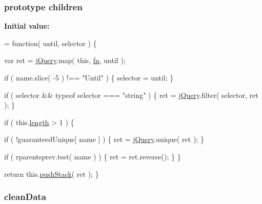 \subsubsection[{children}]{ {\bf prototype} children}\label{jquery-1_810_82-vsdoc_8js_a8f481f41dc3f2af7fcadd06c7fba0815}
{\bfseries Initial value\+:}
\begin{DoxyCode}
= \textcolor{keyword}{function}( until, selector ) \{


        var ret = \hyperlink{jquery-1_810_82-vsdoc_8js_add5237586d970a38a81f990e8eb28c6c}{jQuery}.map( \textcolor{keyword}{this}, \hyperlink{jquery-1_810_82-vsdoc_8js_acef6bdaf6b9b20fdcca1ea86f0902c3b}{fn}, until );

        \textcolor{keywordflow}{if} ( name.slice( -5 ) !== \textcolor{stringliteral}{"Until"} ) \{
            selector = until;
        \}

        \textcolor{keywordflow}{if} ( selector && typeof selector === \textcolor{stringliteral}{"string"} ) \{
            ret = \hyperlink{jquery-1_810_82-vsdoc_8js_add5237586d970a38a81f990e8eb28c6c}{jQuery}.filter( selector, ret );
        \}

        \textcolor{keywordflow}{if} ( this.\hyperlink{jquery-1_810_82-vsdoc_8js_aa7de35d58da66d9944ab9cbe82c19640}{length} > 1 ) \{
            
            \textcolor{keywordflow}{if} ( !guaranteedUnique[ name ] ) \{
                ret = \hyperlink{jquery-1_810_82-vsdoc_8js_add5237586d970a38a81f990e8eb28c6c}{jQuery}.unique( ret );
            \}

            
            \textcolor{keywordflow}{if} ( rparentsprev.test( name ) ) \{
                ret = ret.reverse();
            \}
        \}

        \textcolor{keywordflow}{return} this.\hyperlink{jquery-1_810_82-vsdoc_8js_afc3a7db1ef2b526338c06c07cecccd44}{pushStack}( ret );
    \}
\end{DoxyCode}
\hypertarget{jquery-1_810_82-vsdoc_8js_a7ff5108ab2f23c4dca4bfec7d8045ede}{}
\subsubsection[{clean\+Data}]{ clean\+Data}\label{jquery-1_810_82-vsdoc_8js_a7ff5108ab2f23c4dca4bfec7d8045ede}
\hypertarget{jquery-1_810_82-vsdoc_8js_ad0cc4718ee86b70a5fee95ed96e57fef}{}
